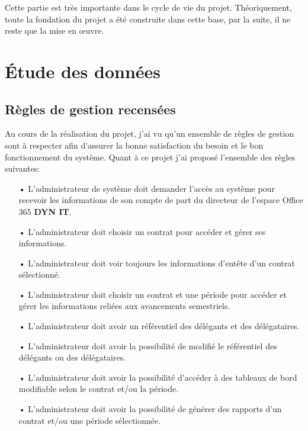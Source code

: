 Cette partie est très importante dans le cycle de vie du projet. Théoriquement, toute la fondation du projet a été construite dans cette base, par la suite, il ne reste que la mise en œuvre.
	\section{Étude des données}
	\subsection{Règles de gestion recensées}
	Au cours de la réalisation du projet, j'ai vu qu’un ensemble de règles de gestion sont à respecter afin d'assurer la bonne satisfaction du besoin et le bon fonctionnement du système. Quant à ce projet j'ai proposé l’ensemble des règles suivantes:
	\begin{itemize}
		\item[•] L'administrateur de système doit demander l’accès au système pour recevoir les informations de son compte de part du directeur de l'espace Office 365 \textbf{DYN IT}.
		\item[•] L'administrateur doit choisir un contrat pour accéder et gérer ses informations.
		\item[•] L'administrateur doit voir toujours les informations d'entête d'un contrat sélectionné.
		\item[•] L'administrateur doit choisir un contrat et une période pour accéder et gérer les informations reliées aux avancements semestriels.
		\item[•] L'administrateur doit avoir un référentiel des délégants et des délégataires.
		\item[•] L'administrateur doit avoir la possibilité de modifié le référentiel des délégants ou des délégataires.
		\item[•] L'administrateur doit avoir la possibilité d'accéder à des tableaux de bord modifiable selon le contrat et/ou la période.
		\item[•] L'administrateur doit avoir la possibilité de générer des rapports d'un contrat et/ou une période sélectionnée.
	\end{itemize}
